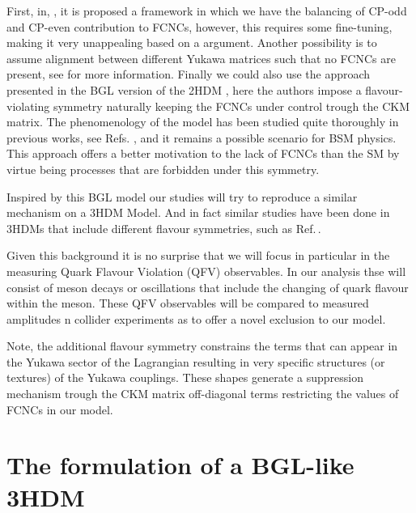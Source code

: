 First, in, \cite{Ferreira_2011,Nebot_2015,ferreira2019strong}, it is proposed a framework in which we have the balancing of CP-odd and CP-even contribution to FCNCs, however, this requires some fine-tuning, making it very unappealing based on a  argument. 
% 
Another possibility is to assume alignment between different Yukawa matrices such that no FCNCs are present, see \cite{Pich_2009,Jung_2010,Jung_2011} for more information. 
%
Finally we could also use the approach presented in the BGL version of the 2HDM \cite{Branco_1996,LAVOURA1994}, here the authors impose a flavour-violating symmetry naturally keeping the FCNCs under control trough the CKM matrix. 
%
The phenomenology of the model has been studied quite thoroughly in previous works, see Refs. \cite{Botella_2014,Botella_2016}, and it remains a possible scenario for BSM physics.
%
This approach offers a better motivation to the lack of FCNCs than the SM by virtue being processes that are forbidden under this symmetry. 

Inspired by this BGL model our studies will try to reproduce a similar mechanism on a 3HDM Model. 
%
And in fact similar studies have been done in 3HDMs that include different flavour symmetries, such as Ref.\,\cite{Camargo_Molina_2018}.

Given this background it is no surprise that we will focus in particular in the measuring Quark Flavour Violation (QFV) observables. 
%
In our analysis thse will consist of meson decays or oscillations that include the changing of quark flavour within the meson. 
%
These QFV observables will  be compared to measured amplitudes n collider experiments as to offer a novel exclusion to our model. 

Note, the additional flavour symmetry constrains the terms that can appear in the Yukawa sector of the Lagrangian resulting in very specific structures (or textures) of the Yukawa couplings.
%
These shapes generate a suppression mechanism trough the CKM matrix off-diagonal terms restricting the values of FCNCs in our model.
 
\section{The formulation of a BGL-like 3HDM} 

